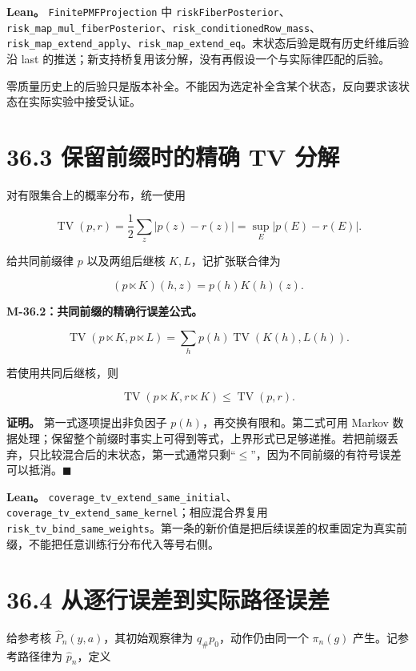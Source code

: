 \documentclass[
  11pt,
  oneside]{book}
\begin{document}
\textbf{Lean。} \nolinkurl{FinitePMFProjection} 中 \nolinkurl{riskFiberPosterior}、\nolinkurl{risk_map_mul_fiberPosterior}、\nolinkurl{risk_conditionedRow_mass}、\nolinkurl{risk_map_extend_apply}、\nolinkurl{risk_map_extend_eq}。末状态后验是既有历史纤维后验沿 last 的推送；新支持桥复用该分解，没有再假设一个与实际律匹配的后验。

零质量历史上的后验只是版本补全。不能因为选定补全含某个状态，反向要求该状态在实际实验中接受认证。

\section{36.3 保留前缀时的精确 TV 分解}\label{ux4fddux7559ux524dux7f00ux65f6ux7684ux7cbeux786e-tv-ux5206ux89e3}

对有限集合上的概率分布，统一使用

\[\operatorname{TV}(p,r)=\frac12\sum_z|p(z)-r(z)|
=\sup_E|p(E)-r(E)|.\]

给共同前缀律 \(p\) 以及两组后继核 \(K,L\)，记扩张联合律为

\[(p\ltimes K)(h,z)=p(h)K(h)(z).\]

\hypertarget{m-36-2}{}\label{m-36-2}

\textbf{M-36.2：共同前缀的精确行误差公式。}

\[\operatorname{TV}(p\ltimes K,p\ltimes L)
=\sum_h p(h)\operatorname{TV}(K(h),L(h)).\]

若使用共同后继核，则

\[\operatorname{TV}(p\ltimes K,r\ltimes K)\le\operatorname{TV}(p,r).\]

\textbf{证明。} 第一式逐项提出非负因子 \(p(h)\)，再交换有限和。第二式可用 Markov 数据处理；保留整个前缀时事实上可得到等式，上界形式已足够递推。若把前缀丢弃，只比较混合后的末状态，第一式通常只剩``\(\le\)''，因为不同前缀的有符号误差可以抵消。\(\blacksquare\)

\textbf{Lean。} \nolinkurl{coverage_tv_extend_same_initial}、\nolinkurl{coverage_tv_extend_same_kernel}；相应混合界复用 \nolinkurl{risk_tv_bind_same_weights}。第一条的新价值是把后续误差的权重固定为真实前缀，不能把任意训练行分布代入等号右侧。

\section{36.4 从逐行误差到实际路径误差}\label{ux4eceux9010ux884cux8befux5deeux5230ux5b9eux9645ux8defux5f84ux8befux5dee}

给参考核 \(\widehat P_n(y,a)\)，其初始观察律为 \(q_\#p_0\)，动作仍由同一个 \(\pi_n(g)\) 产生。记参考路径律为 \(\widehat p_n\)，定义
\end{document}
